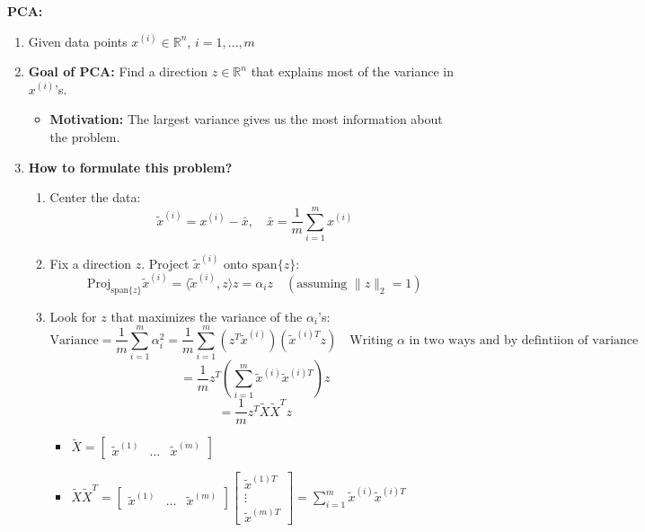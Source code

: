 \begin{example} \textbf{PCA:}
    \begin{enumerate}
        \item Given data points \( x^{(i)} \in \mathbb{R}^n \), $i=1,\ldots,m$
        
        \item \textbf{Goal of PCA:} Find a direction \( z \in \mathbb{R}^n \) that explains most of the variance in \( x^{(i)} \)'s.
        \begin{itemize}
            \item \textbf{Motivation:} The largest variance gives us the most information about the problem.
        \end{itemize}
        \item \textbf{How to formulate this problem?}
        
        \begin{enumerate}
            \item Center the data:
            \[
            \tilde{x}^{(i)} = x^{(i)} - \bar{x}, \quad \bar{x} = \frac{1}{m} \sum_{i=1}^{m} x^{(i)}
            \]
            
            \item Fix a direction \( z \). Project \( \tilde{x}^{(i)} \) onto \( \text{span}\{z\} \):
            \[
            \text{Proj}_{\text{span}\{z\}} \tilde{x}^{(i)} = \langle \tilde{x}^{(i)}, z \rangle z = \alpha_i z \quad (\text{assuming } \|z\|_2 = 1)
            \]
            
            \item Look for $z$ that maximizes the variance of the \( \alpha_i \)'s:
            \[
            \text{Variance} = \frac{1}{m} \sum_{i=1}^{m} \alpha_i^2 = \frac{1}{m} \sum_{i=1}^{m} \left( z^T \tilde{x}^{(i)} \right) \left( \tilde{x}^{(i)T} z \right) \quad \text{Writing $\alpha$ in two ways and by defintiion of variance}
            \]
            \[
            = \frac{1}{m} z^T \left( \sum_{i=1}^{m} \tilde{x}^{(i)} \tilde{x}^{(i)T} \right) z
            \]
            \[
            = \frac{1}{m} z^T \tilde{X} \tilde{X}^T z
            \]
            \begin{itemize}
                \item $\tilde{X} = \begin{bmatrix} \tilde{x}^{(1)} & \ldots & \tilde{x}^{(m)} \end{bmatrix}$
                \item $
            \tilde{X} \tilde{X}^T = 
            \begin{bmatrix}
            \tilde{x}^{(1)} & \ldots & \tilde{x}^{(m)}
            \end{bmatrix}
            \begin{bmatrix}
            \tilde{x}^{(1)T} \\
            \vdots \\
            \tilde{x}^{(m)T}
            \end{bmatrix}
            = \sum_{i=1}^{m} \tilde{x}^{(i)} \tilde{x}^{(i)T}$
            \end{itemize}
        \end{enumerate}
        

\end{enumerate}
\end{example}
